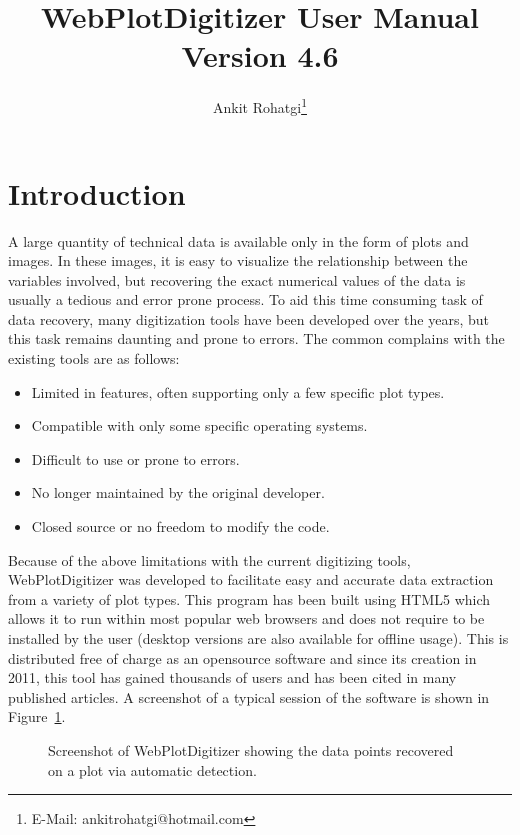 \documentclass[letterpaper, 11pt]{article}
\begin{document}
\title{WebPlotDigitizer User Manual\\ Version 4.6}
\author{Ankit Rohatgi\footnote{E-Mail: ankitrohatgi@hotmail.com}}
\maketitle
\tableofcontents
\newpage
\section{Introduction}
A large quantity of technical data is available only in the form of plots and images. In these images, it is easy to visualize the relationship between the variables involved, but recovering the exact numerical values of the data is usually a tedious and error prone process. To aid this time consuming task of data recovery, many digitization tools have been developed over the years, but this task remains daunting and prone to errors. The common complains with the existing tools are as follows:

\begin{itemize}
\item{Limited in features, often supporting only a few specific plot types.}
\item{Compatible with only some specific operating systems.}
\item{Difficult to use or prone to errors.}
\item{No longer maintained by the original developer.}
\item{Closed source or no freedom to modify the code.}
\end{itemize}

Because of the above limitations with the current digitizing tools, WebPlotDigitizer was developed to facilitate easy and accurate data extraction from a variety of plot types. This program has been built using HTML5 which allows it to run within most popular web browsers and does not require to be installed by the user (desktop versions are also available for offline usage). This is distributed free of charge as an opensource software and since its creation in 2011, this tool has gained thousands of users and has been cited in many published articles. A screenshot of a typical session of the software is shown in Figure~\ref{fig:screenshot}.

\begin{figure}
\begin{center}
\caption{Screenshot of WebPlotDigitizer showing the data points recovered on a plot via automatic detection.}
\label{fig:screenshot}
\end{center}
\end{figure}
\end{document}
